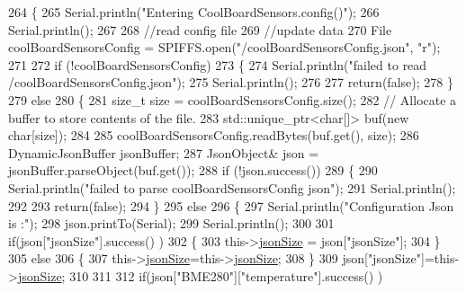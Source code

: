 \begin{DoxyCode}
264 \{
265     Serial.println(\textcolor{stringliteral}{"Entering CoolBoardSensors.config()"});
266     Serial.println();
267 
268     \textcolor{comment}{//read config file}
269     \textcolor{comment}{//update data}
270     File coolBoardSensorsConfig = SPIFFS.open(\textcolor{stringliteral}{"/coolBoardSensorsConfig.json"}, \textcolor{stringliteral}{"r"});
271 
272     \textcolor{keywordflow}{if} (!coolBoardSensorsConfig) 
273     \{
274         Serial.println(\textcolor{stringliteral}{"failed to read /coolBoardSensorsConfig.json"});
275         Serial.println();
276 
277         \textcolor{keywordflow}{return}(\textcolor{keyword}{false});
278     \}
279     \textcolor{keywordflow}{else}
280     \{
281         \textcolor{keywordtype}{size\_t} size = coolBoardSensorsConfig.size();
282         \textcolor{comment}{// Allocate a buffer to store contents of the file.}
283         std::unique\_ptr<char[]> buf(\textcolor{keyword}{new} \textcolor{keywordtype}{char}[size]);
284 
285         coolBoardSensorsConfig.readBytes(buf.get(), size);
286         DynamicJsonBuffer jsonBuffer;
287         JsonObject& json = jsonBuffer.parseObject(buf.get());
288         \textcolor{keywordflow}{if} (!json.success()) 
289         \{
290             Serial.println(\textcolor{stringliteral}{"failed to parse coolBoardSensorsConfig json"});
291             Serial.println();
292     
293             \textcolor{keywordflow}{return}(\textcolor{keyword}{false});
294         \} 
295         \textcolor{keywordflow}{else}
296         \{
297             Serial.println(\textcolor{stringliteral}{"Configuration Json is :"});
298             json.printTo(Serial);
299             Serial.println();
300       
301             \textcolor{keywordflow}{if}(json[\textcolor{stringliteral}{"jsonSize"}].success() )
302             \{
303                 this->\hyperlink{classCoolBoardSensors_a05a40dc80bfff14ffb830f549b876f8d}{jsonSize} = json[\textcolor{stringliteral}{"jsonSize"}]; 
304             \}
305             \textcolor{keywordflow}{else}
306             \{
307                 this->\hyperlink{classCoolBoardSensors_a05a40dc80bfff14ffb830f549b876f8d}{jsonSize}=this->\hyperlink{classCoolBoardSensors_a05a40dc80bfff14ffb830f549b876f8d}{jsonSize};          
308             \}
309             json[\textcolor{stringliteral}{"jsonSize"}]=this->\hyperlink{classCoolBoardSensors_a05a40dc80bfff14ffb830f549b876f8d}{jsonSize};
310 
311             
312             \textcolor{keywordflow}{if}(json[\textcolor{stringliteral}{"BME280"}][\textcolor{stringliteral}{"temperature"}].success() )

\end{DoxyCode}
